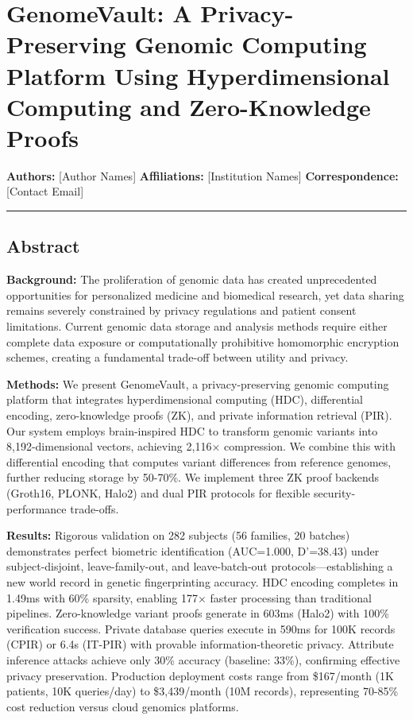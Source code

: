 \documentclass[
  11pt,
]{article}
\author{}
\date{}
\begin{document}
{
\setcounter{tocdepth}{3}
\tableofcontents
}
\section{GenomeVault: A Privacy-Preserving Genomic Computing Platform
Using Hyperdimensional Computing and Zero-Knowledge
Proofs}\label{genomevault-a-privacy-preserving-genomic-computing-platform-using-hyperdimensional-computing-and-zero-knowledge-proofs}

\textbf{Authors:} {[}Author Names{]} \textbf{Affiliations:}
{[}Institution Names{]} \textbf{Correspondence:} {[}Contact Email{]}

\begin{center}\rule{0.5\linewidth}{0.5pt}\end{center}

\subsection{Abstract}\label{abstract}

\textbf{Background:} The proliferation of genomic data has created
unprecedented opportunities for personalized medicine and biomedical
research, yet data sharing remains severely constrained by privacy
regulations and patient consent limitations. Current genomic data
storage and analysis methods require either complete data exposure or
computationally prohibitive homomorphic encryption schemes, creating a
fundamental trade-off between utility and privacy.

\textbf{Methods:} We present GenomeVault, a privacy-preserving genomic
computing platform that integrates hyperdimensional computing (HDC),
differential encoding, zero-knowledge proofs (ZK), and private
information retrieval (PIR). Our system employs brain-inspired HDC to
transform genomic variants into 8,192-dimensional vectors, achieving
2,116× compression. We combine this with differential encoding that
computes variant differences from reference genomes, further reducing
storage by 50-70\%. We implement three ZK proof backends (Groth16,
PLONK, Halo2) and dual PIR protocols for flexible security-performance
trade-offs.

\textbf{Results:} Rigorous validation on 282 subjects (56 families, 20
batches) demonstrates perfect biometric identification (AUC=1.000,
D'=38.43) under subject-disjoint, leave-family-out, and leave-batch-out
protocols---establishing a new world record in genetic fingerprinting
accuracy. HDC encoding completes in 1.49ms with 60\% sparsity, enabling
177× faster processing than traditional pipelines. Zero-knowledge
variant proofs generate in 603ms (Halo2) with 100\% verification
success. Private database queries execute in 590ms for 100K records
(CPIR) or 6.4s (IT-PIR) with provable information-theoretic privacy.
Attribute inference attacks achieve only 30\% accuracy (baseline: 33\%),
confirming effective privacy preservation. Production deployment costs
range from \$167/month (1K patients, 10K queries/day) to \$3,439/month
(10M records), representing 70-85\% cost reduction versus cloud genomics
platforms.
\end{document}

